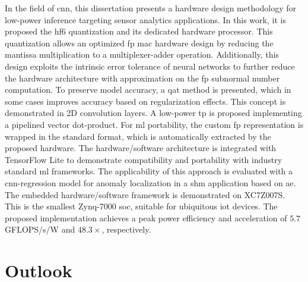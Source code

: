 In the field of \gls{cnn}, this dissertation presents a hardware design methodology for low-power inference targeting sensor analytics applications. In this work, it is proposed the \gls{hf6} quantization and its dedicated hardware processor. This quantization allows an optimized \gls{fp} \gls{mac} hardware design by reducing the mantissa multiplication to a multiplexer-adder operation. Additionally, this design exploits the intrinsic error tolerance of neural networks to further reduce the hardware architecture with approximation on the \gls{fp} subnormal number computation. To preserve model accuracy, a \gls{qat} method is presented, which in some cases improves accuracy based on regularization effects. This concept is demonstrated in 2D convolution layers. A low-power \gls{tp} is proposed implementing a pipelined vector dot-product. For \gls{ml} portability, the custom \gls{fp} representation is wrapped in the standard format, which is automatically extracted by the proposed hardware. The hardware/software architecture is integrated with TensorFlow Lite to demonstrate compatibility and portability with industry standard \gls{ml} frameworks. The applicability of this approach is evaluated with a \gls{cnn}-regression model for anomaly localization in a \gls{shm} application based on \gls{ae}. The embedded hardware/software framework is demonstrated on XC7Z007S. This is the smallest Zynq-7000 \gls{soc}, suitable for ubiquitous \gls{iot} devices. The proposed implementation achieves a peak power efficiency and acceleration of $5.7$ GFLOPS/s/W and $48.3\times$, respectively.

\section{Outlook}

